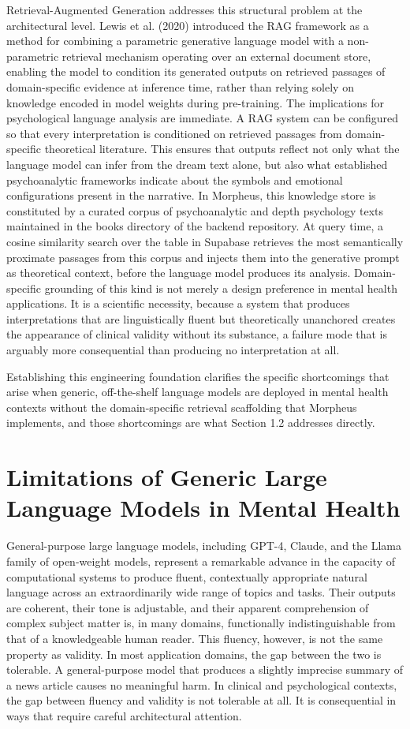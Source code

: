 \documentclass[12pt,a4paper]{report}
\DeclareRobustCommand{\code}[1]{\texttt{\detokenize{#1}}}
\begin{document}
Retrieval-Augmented Generation addresses this structural problem at the architectural level. Lewis et al. (2020) introduced the RAG framework as a method for combining a parametric generative language model with a non-parametric retrieval mechanism operating over an external document store, enabling the model to condition its generated outputs on retrieved passages of domain-specific evidence at inference time, rather than relying solely on knowledge encoded in model weights during pre-training. The implications for psychological language analysis are immediate. A RAG system can be configured so that every interpretation is conditioned on retrieved passages from domain-specific theoretical literature. This ensures that outputs reflect not only what the language model can infer from the dream text alone, but also what established psychoanalytic frameworks indicate about the symbols and emotional configurations present in the narrative. In Morpheus, this knowledge store is constituted by a curated corpus of psychoanalytic and depth psychology texts maintained in the books directory of the backend repository. At query time, a cosine similarity search over the \code{knowledge_base} table in Supabase retrieves the most semantically proximate passages from this corpus and injects them into the generative prompt as theoretical context, before the language model produces its analysis. Domain-specific grounding of this kind is not merely a design preference in mental health applications. It is a scientific necessity, because a system that produces interpretations that are linguistically fluent but theoretically unanchored creates the appearance of clinical validity without its substance, a failure mode that is arguably more consequential than producing no interpretation at all.

Establishing this engineering foundation clarifies the specific shortcomings that arise when generic, off-the-shelf language models are deployed in mental health contexts without the domain-specific retrieval scaffolding that Morpheus implements, and those shortcomings are what Section 1.2 addresses directly.

\section{Limitations of Generic Large Language Models in Mental Health}
General-purpose large language models, including GPT-4, Claude, and the Llama family of open-weight models, represent a remarkable advance in the capacity of computational systems to produce fluent, contextually appropriate natural language across an extraordinarily wide range of topics and tasks. Their outputs are coherent, their tone is adjustable, and their apparent comprehension of complex subject matter is, in many domains, functionally indistinguishable from that of a knowledgeable human reader. This fluency, however, is not the same property as validity. In most application domains, the gap between the two is tolerable. A general-purpose model that produces a slightly imprecise summary of a news article causes no meaningful harm. In clinical and psychological contexts, the gap between fluency and validity is not tolerable at all. It is consequential in ways that require careful architectural attention.
\end{document}
